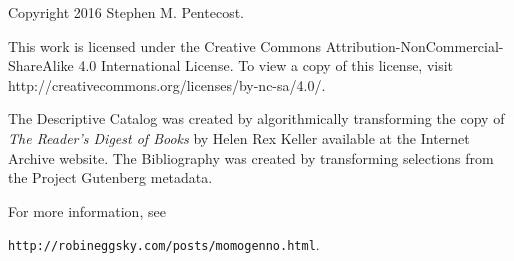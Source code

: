 \newpage
\vspace*{1.0in}
Copyright 2016 Stephen M. Pentecost.
\bigbreak
\bigbreak
\bigbreak
\par
This work is licensed under the Creative Commons Attribution-NonCommercial-ShareAlike 4.0 International License. To view a copy of this license, visit http://creativecommons.org/licenses/by-nc-sa/4.0/.
\bigbreak
\par
The Descriptive Catalog was created by algorithmically transforming the copy of \textit{The Reader's Digest of Books} by Helen Rex Keller available at the Internet Archive website.  The Bibliography was created by transforming selections from the Project Gutenberg metadata.
\bigbreak
\par
For more information, see
\par
\vspace*{0.10in}
\texttt{http://robineggsky.com/posts/momogenno.html}.
\par
